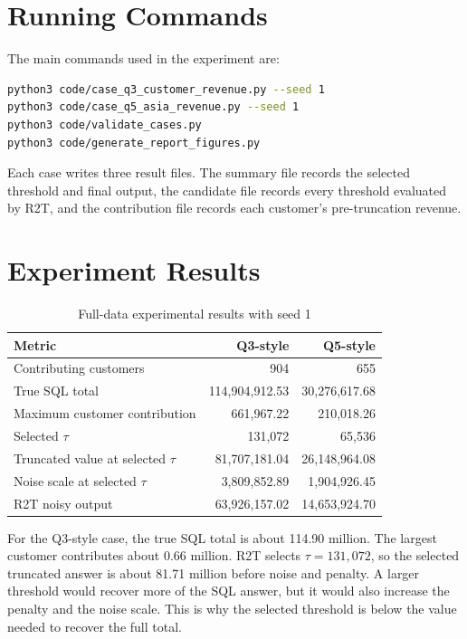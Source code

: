 \documentclass[12pt,a4paper]{report}
\begin{document}
\section{Running Commands}

The main commands used in the experiment are:

\begin{lstlisting}[language=Bash]
python3 code/case_q3_customer_revenue.py --seed 1
python3 code/case_q5_asia_revenue.py --seed 1
python3 code/validate_cases.py
python3 code/generate_report_figures.py
\end{lstlisting}

Each case writes three result files. The summary file records the selected
threshold and final output, the candidate file records every threshold
evaluated by R2T, and the contribution file records each customer's
pre-truncation revenue.

\section{Experiment Results}

\begin{table}[H]
\centering
\begin{tabular}{|l|r|r|}
\hline
\textbf{Metric} & \textbf{Q3-style} & \textbf{Q5-style} \\ \hline
Contributing customers & 904 & 655 \\ \hline
True SQL total & 114,904,912.53 & 30,276,617.68 \\ \hline
Maximum customer contribution & 661,967.22 & 210,018.26 \\ \hline
Selected $\tau$ & 131,072 & 65,536 \\ \hline
Truncated value at selected $\tau$ & 81,707,181.04 & 26,148,964.08 \\ \hline
Noise scale at selected $\tau$ & 3,809,852.89 & 1,904,926.45 \\ \hline
R2T noisy output & 63,926,157.02 & 14,653,924.70 \\ \hline
\end{tabular}
\caption{Full-data experimental results with seed 1}
\end{table}

For the Q3-style case, the true SQL total is about 114.90 million.  The
largest customer contributes about 0.66 million.  R2T selects
$\tau=131{,}072$, so the selected truncated answer is about 81.71
million before noise and penalty.  A larger threshold would recover more
of the SQL answer, but it would also increase the penalty and the noise
scale.  This is why the selected threshold is below the value needed to
recover the full total.
\end{document}
